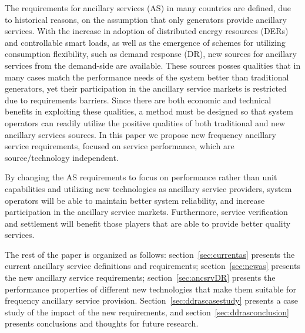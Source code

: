
The requirements for ancillary services (AS) in many countries are defined, due to historical reasons, on the assumption that only generators provide ancillary services. With the increase in adoption of distributed energy resources (DERs) and controllable smart loads, as well as the emergence of schemes for utilizing consumption flexibility, such as demand response (DR), new sources for ancillary services from the demand-side are available. 
These sources posses qualities that in many cases match the performance needs of the system better than traditional generators, yet their participation in the ancillary service markets is restricted due to requirements barriers. Since there are both economic and technical benefits in exploiting these qualities, a method must be designed so that system operators can readily utilize the positive qualities of both traditional and new ancillary services sources. In this paper we propose new frequency ancillary service requirements, focused on service performance, which are source/technology independent. 

By changing the AS requirements to focus on performance rather than unit capabilities and utilizing new technologies as ancillary service providers, system operators will be able to maintain better system reliability\cite{entsoe2014demand}, and increase participation in the ancillary service markets. Furthermore, service verification and settlement will benefit those players that are able to provide better quality services.

The rest of the paper is organized as follows: section~\ref{sec:currentas} presents the current ancillary service definitions and requirements; section~\ref{sec:newas} presents the new ancillary service requirements; section~\ref{sec:ancsrvDR} presents the performance properties of different new technologies that make them suitable for frequency ancillary service provision. Section~\ref{sec:ddrascasestudy} presents a case study of the impact of the new requirements, and section~\ref{sec:ddrasconclusion} presents conclusions and thoughts for future research. 


